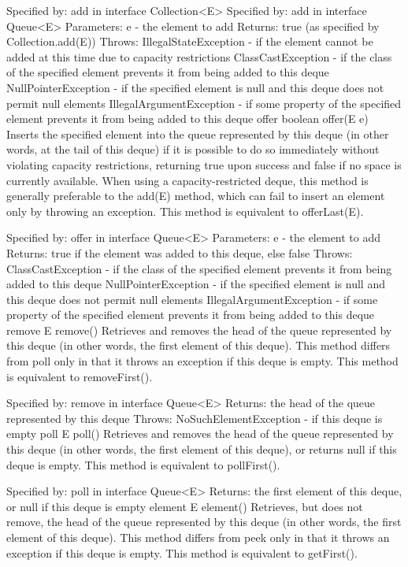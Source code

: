 \documentclass{book}
\begin{document}
Specified by:
add in interface Collection<E>
Specified by:
add in interface Queue<E>
Parameters:
e - the element to add
Returns:
true (as specified by Collection.add(E))
Throws:
IllegalStateException - if the element cannot be added at this time due to capacity restrictions
ClassCastException - if the class of the specified element prevents it from being added to this deque
NullPointerException - if the specified element is null and this deque does not permit null elements
IllegalArgumentException - if some property of the specified element prevents it from being added to this deque
offer
boolean offer(E e)
Inserts the specified element into the queue represented by this deque (in other words, at the tail of this deque) if it is possible to do so immediately without violating capacity restrictions, returning true upon success and false if no space is currently available. When using a capacity-restricted deque, this method is generally preferable to the add(E) method, which can fail to insert an element only by throwing an exception.
This method is equivalent to offerLast(E).

Specified by:
offer in interface Queue<E>
Parameters:
e - the element to add
Returns:
true if the element was added to this deque, else false
Throws:
ClassCastException - if the class of the specified element prevents it from being added to this deque
NullPointerException - if the specified element is null and this deque does not permit null elements
IllegalArgumentException - if some property of the specified element prevents it from being added to this deque
remove
E remove()
Retrieves and removes the head of the queue represented by this deque (in other words, the first element of this deque). This method differs from poll only in that it throws an exception if this deque is empty.
This method is equivalent to removeFirst().

Specified by:
remove in interface Queue<E>
Returns:
the head of the queue represented by this deque
Throws:
NoSuchElementException - if this deque is empty
poll
E poll()
Retrieves and removes the head of the queue represented by this deque (in other words, the first element of this deque), or returns null if this deque is empty.
This method is equivalent to pollFirst().

Specified by:
poll in interface Queue<E>
Returns:
the first element of this deque, or null if this deque is empty
element
E element()
Retrieves, but does not remove, the head of the queue represented by this deque (in other words, the first element of this deque). This method differs from peek only in that it throws an exception if this deque is empty.
This method is equivalent to getFirst().
\end{document}
